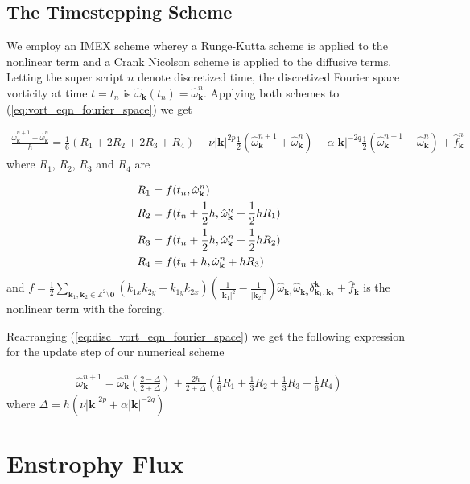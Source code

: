 \documentclass[9pt]{article}
\newcommand{\omegahat}[1]{\hat{\omega}_{ \mathbf{#1} } }								%
\newcommand{\bfk}{\mathbf{k}}								%
\newcommand{\bfkn}[1]{\mathbf{k}_{#1}}								%
\begin{document}
\subsection{The Timestepping Scheme}

We employ an IMEX scheme wherey a Runge-Kutta scheme is applied to the nonlinear term and a Crank Nicolson scheme is applied to the diffusive terms. Letting the super script $n$ denote discretized time, the discretized Fourier space vorticity at time $t = t_n$ is $\omegahat{\bfk}(t_n) = \omegahat{\bfk}^n$. Applying both schemes to (\ref{eq:vort_eqn_fourier_space}) we get 

\begin{align}
	\frac{\omegahat{\bfk}^{n + 1} - \omegahat{\bfk}^n}{h} = \frac{1}{6}\left(R_1 + 2 R_2 + 2 R_3 + R_4\right) - \nu |\bfk|^{2p}\frac{1}{2}(\omegahat{\bfk}^{n + 1} + \omegahat{\bfk}^{n}) - \alpha|\bfk|^{-2q}\frac{1}{2}(\omegahat{\bfk}^{n + 1} + \omegahat{\bfk}^{n}) + \hat{f}_{\bfk}^{n}
	\label{eq:disc_vort_eqn_fourier_space}
\end{align}
where $R_1$, $R_2$, $R_3$ and $R_4$ are 

\begin{align}
R_1 &= f(t_n, \omegahat{\bfk}^{n}) \notag \\
R_2 &= f(t_n + \frac{1}{2}h, \omegahat{\bfk}^{n} + \frac{1}{2}hR_1) \notag \\
R_3 &= f(t_n + \frac{1}{2}h, \omegahat{\bfk}^{n} + \frac{1}{2}hR_2) \notag \\
R_4 &= f(t_n + h, \omegahat{\bfk}^{n} + hR_3)
\end{align}
and $f = \frac{1}{2}	\sum_{\mathbf{k}_1, \mathbf{k}_2\in \mathbb{Z}^2\setminus \mathbf{0}}\left(k_{1x}k_{2y} - k_{1y}k_{2x}\right) \left(\frac{1}{|\bfkn{1}|^2} - \frac{1}{|\bfkn{2}|^2}\right) \omegahat{\bfkn{1}}\omegahat{\bfkn{2}} \delta_{\bfkn{1}, \bfkn{2}}^{\bfk} + \hat{f}_\bfk$ is the nonlinear term with the forcing.

Rearranging (\ref{eq:disc_vort_eqn_fourier_space}) we get the following expression for the update step of our numerical scheme

\begin{align}
\omegahat{\bfk}^{n + 1} = \omegahat{\bfk}^{n} \left(\frac{2 - \Delta}{2 + \Delta}\right) + \frac{2 h}{2 + \Delta}\left(\frac{1}{6}R_1 + \frac{1}{3}R_2  + \frac{1}{3}R_3 + \frac{1}{6}R_4\right)
\end{align}
where $\Delta = h \left(\nu|\bfk|^{2p} + \alpha|\bfk|^{-2q}\right)$
\section{Enstrophy Flux}
\end{document}
